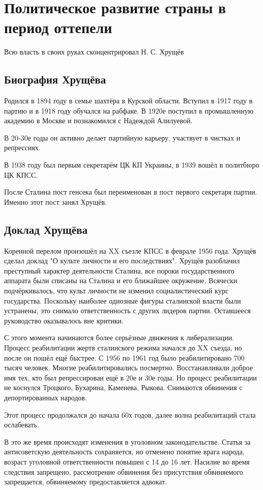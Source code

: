 \documentclass{article}
\begin{document}
\section{Политическое развитие страны в период оттепели}
Всю власть в своих руках сконцентрировал Н. С. Хрущёв
\subsection{Биография Хрущёва}
Родился в 1894 году в семье шахтёра в Курской области. Вступил в 1917 году в партию и в 1918 году обучался на рабфаке. В 1920е поступил в промышленную академию в Москве и познакомился с Надеждой Алилуевой.

В 20-30е годы он активно делает партийную карьеру, участвует в чистках и репрессиях.

В 1938 году был первым секретарём ЦК КП Украины, в 1939 вошёл в политбюро ЦК КПСС.

После Сталина пост генсека был переименован в пост первого секретаря партии. Именно этот пост занял Хрущёв.

\subsection{Доклад Хрущёва}
Коренной перелом произошёл на XX съезле КПСС в феврале 1956 года. Хрущёв сделал доклад "О культе личности и его последствиях". Хрущёв разоблачил преступный характер деятельности Сталина, все пороки государственного аппарата были списаны на Сталина и его ближайшее окружение. Всячески подчёркивалось, что культ личности не изменил социалистический курс государства. Поскольку наиболее одиозные фигуры сталинской власти были устранены, это снимало ответственность с других лидеров партии. Оставшееся руководство оказывалось вне критики.

С этого момента начинаются более серьёзные движения к либерализации. Процесс реабилитации жертв сталинского режима начался до  XX съезда, но после он пошёл ещё быстрее. С 1956 по 1961 год было реабилитировано 700 тысяч человек. Многие реабилитировались посмертно. Восстанавливали доброе имя тех, кто был репрессирован ещё в 20е и 30е годы. Но процесс реабилитации не коснулся Троцкого, Бухарина, Каменева, Рыкова. Снимаются обвинения с депортированных народов.

Этот процесс продолжался до начала 60х годов, далее волна реабилитаций стала ослабевать.

В это же время происходят изменения в уголовном законодательстве. Статья за антисоветскую деятельность сохраняется, но отменено понятие врага народа, возраст уголовной ответственности повышен с 14 до 16 лет. Насилие во время следствия запрещено, рассмотрение обвинения без присутствия обвиняемого запрещается, обвиняемому предоставляется адвокат.
\end{document}
